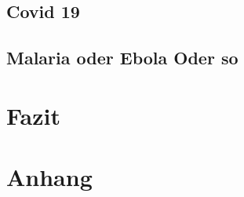 \documentclass[12pt]{scrartcl} %
\begin{document}
\subsection{Covid 19}


\subsection{Malaria oder Ebola Oder so}


\section{Fazit}


\newpage
\section{Anhang}


\newpage
\setlength{\bibitemsep}{\baselineskip}
\printbibliography[heading=bibintoc]
\end{document}
